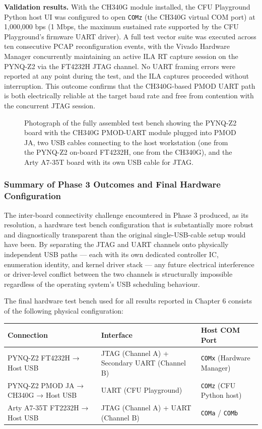 \textbf{Validation results.} With the CH340G module installed, the CFU Playground Python host UI was configured to open \texttt{COMz} (the CH340G virtual COM port) at 1,000,000 bps (1 Mbps, the maximum sustained rate supported by the CFU Playground's firmware UART driver). A full test vector suite was executed across ten consecutive PCAP reconfiguration events, with the Vivado Hardware Manager concurrently maintaining an active ILA RT capture session on the PYNQ-Z2 via the FT4232H JTAG channel. No UART framing errors were reported at any point during the test, and the ILA captures proceeded without interruption. This outcome confirms that the CH340G-based PMOD UART path is both electrically reliable at the target baud rate and free from contention with the concurrent JTAG session.

\begin{figure}[htbp]
\centering
{}
\caption{Photograph of the fully assembled test bench showing the PYNQ-Z2 board with the CH340G PMOD-UART module plugged into PMOD JA, two USB cables connecting to the host workstation (one from the PYNQ-Z2 on-board FT4232H, one from the CH340G), and the Arty A7-35T board with its own USB cable for JTAG.}
\end{figure}

\subsubsection{Summary of Phase 3 Outcomes and Final Hardware Configuration}

The inter-board connectivity challenge encountered in Phase 3 produced, as its resolution, a hardware test bench configuration that is substantially more robust and diagnostically transparent than the original single-USB-cable setup would have been. By separating the JTAG and UART channels onto physically independent USB paths — each with its own dedicated controller IC, enumeration identity, and kernel driver stack — any future electrical interference or driver-level conflict between the two channels is structurally impossible regardless of the operating system's USB scheduling behaviour.

The final hardware test bench used for all results reported in Chapter 6 consists of the following physical configuration:

\begin{table}[htbp]
\centering
\begin{tabular}{lll}
\toprule
Connection & Interface & Host COM Port \\
\midrule
PYNQ-Z2 FT4232H → Host USB & JTAG (Channel A) + Secondary UART (Channel B) & \texttt{COMx} (Hardware Manager) \\
PYNQ-Z2 PMOD JA → CH340G → Host USB & UART (CFU Playground) & \texttt{COMz} (CFU Python host) \\
Arty A7-35T FT2232H → Host USB & JTAG (Channel A) + UART (Channel B) & \texttt{COMa} / \texttt{COMb} \\
\bottomrule
\end{tabular}
\end{table}

